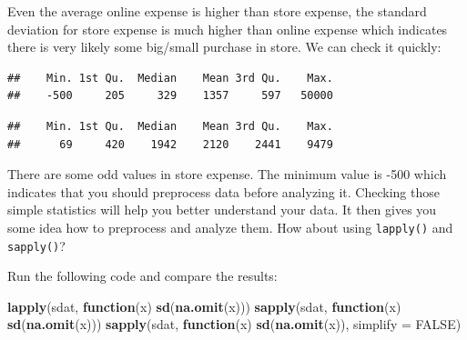 \documentclass[12pt,]{krantz}
\makeatletter
\newenvironment{Shaded}{\begin{snugshade}}{\end{snugshade}}
\newcommand{\ControlFlowTok}[1]{\textcolor[rgb]{0.27,0.27,0.27}{\textbf{#1}}}
\newcommand{\DataTypeTok}[1]{\textcolor[rgb]{0.27,0.27,0.27}{#1}}
\newcommand{\KeywordTok}[1]{\textcolor[rgb]{0.27,0.27,0.27}{\textbf{#1}}}
\newcommand{\NormalTok}[1]{#1}
\newcommand{\OperatorTok}[1]{\textcolor[rgb]{0.43,0.43,0.43}{\textbf{#1}}}
\newcommand{\OtherTok}[1]{\textcolor[rgb]{0.37,0.37,0.37}{#1}}
\newenvironment{kframe}{%
\medskip{}
\setlength{\fboxsep}{.8em}
 \def\at@end@of@kframe{}%
 \ifinner\ifhmode%
  \def\at@end@of@kframe{\end{minipage}}%
  \begin{minipage}{\columnwidth}%
 \fi\fi%
 \def\FrameCommand##1{\hskip\@totalleftmargin \hskip-\fboxsep
 \colorbox{shadecolor}{##1}\hskip-\fboxsep
     \hskip-\linewidth \hskip-\@totalleftmargin \hskip\columnwidth}%
 \MakeFramed {\advance\hsize-\width
   \@totalleftmargin\z@ \linewidth\hsize
   \@setminipage}}%
 {\par\unskip\endMakeFramed%
 \at@end@of@kframe}
\renewenvironment{Shaded}{\begin{kframe}}{\end{kframe}}
\makeatother
\begin{document}
Even the average online expense is higher than store expense, the standard deviation for store expense is much higher than online expense which indicates there is very likely some big/small purchase in store. We can check it quickly:

\begin{Shaded}
\end{Shaded}

\begin{verbatim}
##    Min. 1st Qu.  Median    Mean 3rd Qu.    Max. 
##    -500     205     329    1357     597   50000
\end{verbatim}

\begin{Shaded}
\end{Shaded}

\begin{verbatim}
##    Min. 1st Qu.  Median    Mean 3rd Qu.    Max. 
##      69     420    1942    2120    2441    9479
\end{verbatim}

There are some odd values in store expense. The minimum value is -500 which indicates that you should preprocess data before analyzing it. Checking those simple statistics will help you better understand your data. It then gives you some idea how to preprocess and analyze them. How about using \texttt{lapply()} and \texttt{sapply()}?

Run the following code and compare the results:

\begin{Shaded}
\begin{Highlighting}[]
\KeywordTok{lapply}\NormalTok{(sdat, }\ControlFlowTok{function}\NormalTok{(x) }\KeywordTok{sd}\NormalTok{(}\KeywordTok{na.omit}\NormalTok{(x)))}
\KeywordTok{sapply}\NormalTok{(sdat, }\ControlFlowTok{function}\NormalTok{(x) }\KeywordTok{sd}\NormalTok{(}\KeywordTok{na.omit}\NormalTok{(x)))}
\KeywordTok{sapply}\NormalTok{(sdat, }\ControlFlowTok{function}\NormalTok{(x) }\KeywordTok{sd}\NormalTok{(}\KeywordTok{na.omit}\NormalTok{(x)), }\DataTypeTok{simplify =} \OtherTok{FALSE}\NormalTok{)}
\end{Highlighting}
\end{Shaded}
\end{document}
